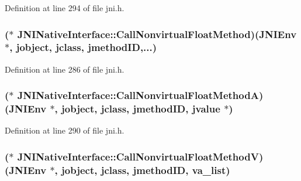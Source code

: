 Definition at line 294 of file jni.\-h.

\hypertarget{struct_j_n_i_native_interface_ab21f3dec305b2f0b72637a954d656a2f}{
\subsubsection[{Call\-Nonvirtual\-Float\-Method}]{($\ast$ J\-N\-I\-Native\-Interface\-::\-Call\-Nonvirtual\-Float\-Method)({\bf J\-N\-I\-Env} $\ast$, {\bf jobject}, {\bf jclass}, {\bf jmethod\-I\-D},...)}}\label{struct_j_n_i_native_interface_ab21f3dec305b2f0b72637a954d656a2f}


Definition at line 286 of file jni.\-h.

\hypertarget{struct_j_n_i_native_interface_aabdf8f6a6088bb63d1a709cbd6409b4d}{
\subsubsection[{Call\-Nonvirtual\-Float\-Method\-A}]{($\ast$ J\-N\-I\-Native\-Interface\-::\-Call\-Nonvirtual\-Float\-Method\-A)({\bf J\-N\-I\-Env} $\ast$, {\bf jobject}, {\bf jclass}, {\bf jmethod\-I\-D}, {\bf jvalue} $\ast$)}}\label{struct_j_n_i_native_interface_aabdf8f6a6088bb63d1a709cbd6409b4d}


Definition at line 290 of file jni.\-h.

\hypertarget{struct_j_n_i_native_interface_af0a7355b353ab3fc0dc61060d8211172}{
\subsubsection[{Call\-Nonvirtual\-Float\-Method\-V}]{($\ast$ J\-N\-I\-Native\-Interface\-::\-Call\-Nonvirtual\-Float\-Method\-V)({\bf J\-N\-I\-Env} $\ast$, {\bf jobject}, {\bf jclass}, {\bf jmethod\-I\-D}, va\-\_\-list)}}\label{struct_j_n_i_native_interface_af0a7355b353ab3fc0dc61060d8211172}


